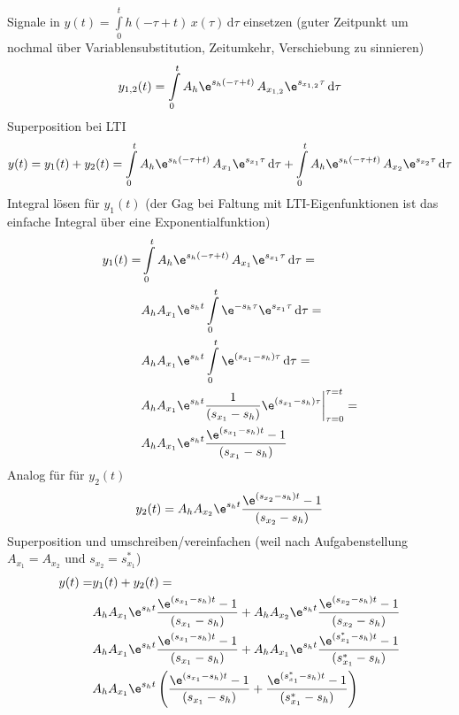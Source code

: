 \begin{ExCalc}
Signale in $y(t) = \int\limits_{0}^{t} h(-\tau+t) \, x(\tau) \, \mathrm{d}\tau$ einsetzen (guter Zeitpunkt um nochmal über Variablensubstitution, Zeitumkehr, Verschiebung zu sinnieren)
%
\begin{align}
y_{1,2}(t) = \int\limits_{0}^{t} A_h \e^{s_h (-\tau+t)} \, A_{x_{1,2}}\e^{s_{x_{1,2}} \tau} \, \mathrm{d}\tau
\end{align}
%
Superposition bei LTI
\begin{align}
y(t) = y_1(t) + y_2(t) =
\int\limits_{0}^{t} A_h \e^{s_h (-\tau+t)} \, A_{x_{1}}\e^{s_{x_{1}} \tau} \, \mathrm{d}\tau
+\int\limits_{0}^{t} A_h \e^{s_h (-\tau+t)} \, A_{x_{2}}\e^{s_{x_{2}} \tau} \, \mathrm{d}\tau
\end{align}
%
Integral lösen für $y_1(t)$ (der Gag bei Faltung mit LTI-Eigenfunktionen ist das einfache Integral über eine Exponentialfunktion)
\begin{align}
y_1(t) =
&\int\limits_{0}^{t} A_h \e^{s_h (-\tau+t)} \, A_{x_{1}}\e^{s_{x_{1}} \tau} \, \mathrm{d}\tau=\\
&A_h A_{x_{1}} \e^{s_h t} \int\limits_{0}^{t} \e^{- s_h \tau} \e^{s_{x_{1}} \tau} \, \mathrm{d}\tau=\\
&A_h A_{x_{1}} \e^{s_h t} \int\limits_{0}^{t} \e^{(s_{x_{1}}-s_h) \tau} \, \mathrm{d}\tau=\\
&A_h A_{x_{1}} \e^{s_h t}  \frac{1}{(s_{x_{1}}-s_h)} \e^{(s_{x_{1}}-s_h) \tau}\bigg|_{\tau=0}^{\tau = t}=\\
&A_h A_{x_{1}} \e^{s_h t}  \frac{\e^{(s_{x_{1}}-s_h) t}-1}{(s_{x_{1}}-s_h)}
\end{align}
Analog für für $y_2(t)$
\begin{align}
y_2(t) = A_h A_{x_{2}} \e^{s_h t}  \frac{\e^{(s_{x_{2}}-s_h) t}-1}{(s_{x_{2}}-s_h)}
\end{align}
%
Superposition und umschreiben/vereinfachen (weil nach Aufgabenstellung $A_{x_1}=A_{x_2}$ und $s_{x_2} = s^*_{x_1}$)
\begin{align}
y(t) = &y_1(t) + y_2(t) =\\
&A_h A_{x_{1}} \e^{s_h t}  \frac{\e^{(s_{x_{1}}-s_h) t}-1}{(s_{x_{1}}-s_h)}+
A_h A_{x_{2}} \e^{s_h t}  \frac{\e^{(s_{x_{2}}-s_h) t}-1}{(s_{x_{2}}-s_h)}\\
&A_h A_{x_{1}} \e^{s_h t}  \frac{\e^{(s_{x_{1}}-s_h) t}-1}{(s_{x_{1}}-s_h)}+
A_h A_{x_{1}} \e^{s_h t}  \frac{\e^{(s^*_{x_{1}}-s_h) t}-1}{(s^*_{x_{1}}-s_h)}\\
&A_h A_{x_{1}} \e^{s_h t}  \left(\frac{\e^{(s_{x_{1}}-s_h) t}-1}{(s_{x_{1}}-s_h)}+\frac{\e^{(s^*_{x_{1}}-s_h) t}-1}{(s^*_{x_{1}}-s_h)}\right)

\end{align}
\end{ExCalc}
